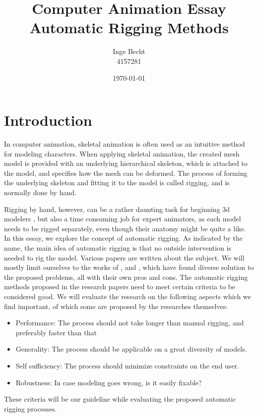 \documentclass{article}
\title{Computer Animation Essay\\ Automatic Rigging Methods}
\author{Inge Becht\\ 4157281}
\date{\today}
\begin{document}
\maketitle

\section{Introduction}
In computer animation, skeletal animation is often used as an intuitive method for modeling characters. When applying skeletal animation, the created mesh model is provided with an underlying hierarchical skeleton, which is attached to the model, and specifies how the mesh can be deformed. The process of forming the underlying skeleton and fitting it to the model is called rigging, and is normally done by hand. 

Rigging by hand, however, can be a rather daunting task for beginning 3d modelers \citep{paper1}, but also a time consuming job for expert animators, as each model needs to be rigged separately, even though their anatomy might be quite a like.
In this essay, we explore the concept of automatic rigging. As indicated by the name, the main idea of automatic rigging is that no outside intervention is needed to rig the model.
Various papers are written about the subject. We will mostly limit ourselves to the works of \citep{paper1}, \citep{paper2} and \citep{paper3}, which have found diverse solution to the proposed problems, all with their own pros and cons.
The automatic rigging methods proposed in the research papers need to meet certain criteria to be considered good. We will evaluate the research on the following aspects which we find important, of which some are proposed by the researches themselves:

\begin{itemize}
\item Performance: The process should not take longer than manual rigging, and preferably faster than that
\item Generality: The process should be applicable on a great diversity of models.
\item Self sufficiency: The process should minimize constraints on the end user.
\item Robustness: In case modeling goes wrong, is it easily fixable?
\end{itemize}
These criteria will be our guideline while evaluating the proposed automatic rigging processes.
\end{document}

